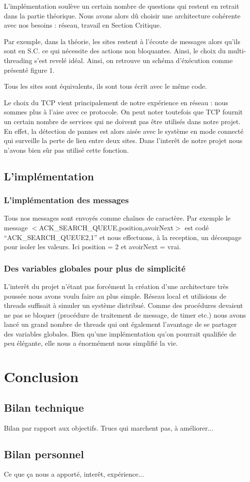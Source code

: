 \documentclass[a4paper,12pt]{article}
\begin{document}
L'implémentation soulève un certain nombre de questions qui restent en retrait dans la partie théorique. Nous avons alors dû choisir une architecture cohérente avec nos besoins : réseau, travail en Section Critique.

Par exemple, dans la théorie, les sites restent à l'écoute de messages alors qu'ils sont en S.C. ce qui nécessite des actions non bloquantes. Ainsi, le choix du multi-threading s'est revelé idéal.
Ainsi, on retrouve un schéma d'éxécution comme présenté figure 1.



Tous les sites sont équivalents, ils sont tous écrit avec le même code.

Le choix du TCP vient principalement de notre expérience en réseau : nous sommes plus à l'aise avec ce protocole. 
On peut noter toutefois que TCP fournit un certain nombre de services qui ne doivent pas être utilisés dans notre projet. En effet, la détection de pannes est alors aisée avec le système en mode connecté qui surveille la perte de lien entre deux sites. Dans l'interêt de notre projet nous n'avons bien sûr pas utilisé cette fonction.

\subsection{L'implémentation}

\subsubsection{L'implémentation des messages}
Tous nos messages sont envoyés comme chaînes de caractère.
Par exemple le message $<$ACK\_SEARCH\_QUEUE,position,avoirNext$>$ est codé ``ACK\_SEARCH\_QUEUE2,1'' et nous effectuons, à la reception, un découpage pour isoler les valeurs. Ici position = 2 et avoirNext = vrai.
\subsubsection{Des variables globales pour plus de simplicité}
L'interêt du projet n'étant pas forcément la création d'une architecture très poussée nous avons voulu faire au plus simple. Réseau local et utilisions de threads suffisait à simuler un système distribué.
Comme des procédures devaient ne pas se bloquer (procédure de traitement de message, de timer etc.) nous avons lancé un grand nombre de threads qui ont également l'avantage de se partager des variables globales. Bien qu'une implémentation qu'on pourrait qualifiée de peu élégante, elle nous a énormément nous simplifié la vie.

\newpage

\section{Conclusion}

\subsection{Bilan technique}
Bilan par rapport aux objectifs.
Trucs qui marchent pas, à améliorer...

\subsection{Bilan personnel}
Ce que ça nous a apporté, interêt, expérience...


\end{document}

